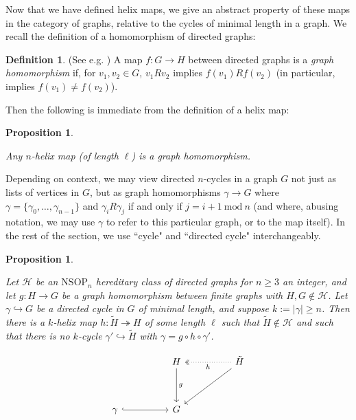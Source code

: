 \documentclass{amsart}
\newtheorem{prop}[theorem]{Proposition}
\theoremstyle{definition}
\newtheorem{definition}[theorem]{Definition}
\theoremstyle{remark}
\numberwithin{equation}{section}
\begin{document}
Now that we have defined helix maps, we give an abstract property of these maps in the category of graphs, relative to the cycles of minimal length in a graph. We recall the definition of a homomorphism of directed graphs:

\begin{definition}\label{graphhomomorphism}(See e.g. \cite{HN04})
 A map $f: G \to H$ between directed graphs is a \emph{graph homomorphism} if, for $v_{1}, v_{2} \in G$, $v_{1} R v_{2}$ implies $f(v_{1})Rf(v_{2})$ (in particular, implies $f(v_{1}) \neq f(v_{2})$).

\end{definition}

Then the following is immediate from the definition of a helix map:

\begin{prop}\label{helix maps are graph homomorphisms}

Any $n$-helix map (of length $\ell$) is a graph homomorphism.
    
\end{prop}



Depending on context, we may view directed $n$-cycles in a graph $G$ not just as lists of vertices in $G$, but as graph homomorphisms $ \gamma \to G$ where $\gamma = \{\gamma_{0}, \ldots, \gamma_{n-1}\}$ and $\gamma_{i} R \gamma_{j}$ if and only if $j = i+1 \mathrm{\: mod \:} n$ (and where, abusing notation, we may use $\gamma$ to refer to this particular graph, or to the map itself). In the rest of the section, we use ``cycle" and ``directed cycle" interchangeably.


\begin{prop}\label{cycle removal}
    
Let $\mathcal{H}$ be an $\mathrm{NSOP}_{n}$ hereditary class of directed graphs for $n \geq 3$ an integer, and let $g: H \to G$ be a graph homomorphism between finite graphs with $H, G \notin \mathcal{H}$. Let $\gamma \hookrightarrow G$ be a directed cycle in $G$ of minimal length, and suppose $k :=|\gamma| \geq n$. Then there is a $k$-helix map $h: \tilde{H} \twoheadrightarrow H$ of some length $\ell$ such that $\tilde{H} \notin \mathcal{H}$ and such that there is no $k$-cycle $\gamma' \hookrightarrow \tilde{H}$ with $\gamma = g\circ h\circ \gamma'$.

$$\begin{tikzcd}
                        &  & H \arrow[dd, "g"] &  & \tilde{H} \arrow[ll, two heads, "h", dotted] \arrow[lldd] \\
                        &  &              &  &                                      \\
\gamma \arrow[rr, hook] &  & G            &  &                                     
\end{tikzcd}$$

\end{prop}
\end{document}
